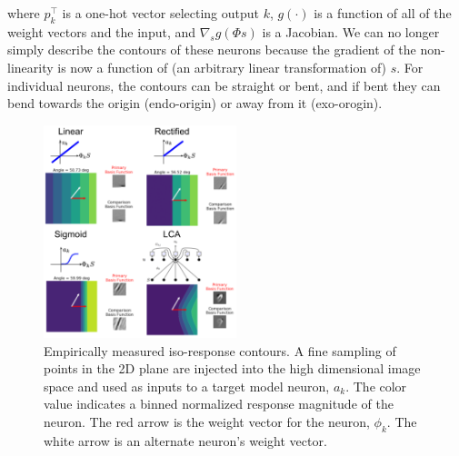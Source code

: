where $p_{k}^\top$ is a one-hot vector selecting output $k$, $g(\cdot)$ is a function of all of the weight vectors and the input, and $\nabla_{s}g(\Phi s)$ is a Jacobian. We can no longer simply describe the contours of these neurons because the gradient of the non-linearity is now a function of (an arbitrary linear transformation of) $s$. For individual neurons, the contours can be straight or bent, and if bent they can bend towards the origin (endo-origin) or away from it (exo-orogin).

\begin{figure}\label{fig:ch4_iso_contours}
\begin{center}
\centerline{\includegraphics[width=0.5\textwidth]{figures/iso_contour_comparison.png}}
\end{center}
\caption{Empirically measured iso-response contours. A fine sampling of points in the 2D plane are injected into the high dimensional image space and used as inputs to a target model neuron, $a_{k}$. The color value indicates a binned normalized response magnitude of the neuron. The red arrow is the weight vector for the neuron, $\phi_{k}$. The white arrow is an alternate neuron's weight vector.}
\end{figure}


